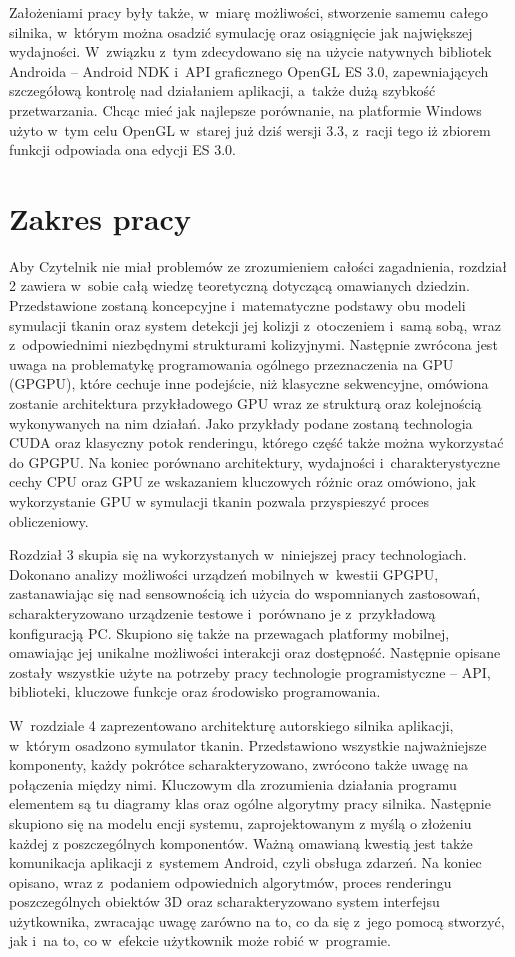 	Założeniami pracy były także, w~miarę możliwości, stworzenie samemu całego silnika, w~którym można osadzić symulację oraz osiągnięcie jak największej wydajności. W~związku z~tym zdecydowano się na użycie natywnych bibliotek Androida -- Android NDK i~API graficznego OpenGL ES 3.0, zapewniających szczegółową kontrolę nad działaniem aplikacji, a~także dużą szybkość przetwarzania. Chcąc mieć jak najlepsze porównanie, na platformie Windows użyto w~tym celu OpenGL w~starej już dziś wersji 3.3, z~racji tego iż zbiorem funkcji odpowiada ona edycji ES 3.0.
	
	\section{Zakres pracy}
	\label{t:wprowadzenie:zakres}
	
	Aby Czytelnik nie miał problemów ze zrozumieniem całości zagadnienia, rozdział 2 zawiera w~sobie całą wiedzę teoretyczną dotyczącą omawianych dziedzin. Przedstawione zostaną koncepcyjne i~matematyczne podstawy obu modeli symulacji tkanin oraz system detekcji jej kolizji z~otoczeniem i~samą sobą, wraz z~odpowiednimi niezbędnymi strukturami kolizyjnymi. Następnie zwrócona jest uwaga na problematykę programowania ogólnego przeznaczenia na GPU (GPGPU), które cechuje inne podejście, niż klasyczne sekwencyjne, omówiona zostanie architektura przykładowego GPU wraz ze strukturą oraz kolejnością wykonywanych na nim działań. Jako przykłady podane zostaną technologia CUDA oraz klasyczny potok renderingu, którego część także można wykorzystać do GPGPU. Na koniec porównano architektury, wydajności i~charakterystyczne cechy CPU oraz GPU ze wskazaniem kluczowych różnic oraz omówiono, jak wykorzystanie GPU w symulacji tkanin pozwala przyspieszyć proces obliczeniowy.
	
	Rozdział 3 skupia się na wykorzystanych w~niniejszej pracy technologiach. Dokonano analizy możliwości urządzeń mobilnych w~kwestii GPGPU, zastanawiając się nad sensownością ich użycia do wspomnianych zastosowań, scharakteryzowano urządzenie testowe i~porównano je z~przykładową konfiguracją PC. Skupiono się także na przewagach platformy mobilnej, omawiając jej unikalne możliwości interakcji oraz dostępność. Następnie opisane zostały wszystkie użyte na potrzeby pracy technologie programistyczne -- API, biblioteki, kluczowe funkcje oraz środowisko programowania.
	
	W~rozdziale 4 zaprezentowano architekturę autorskiego silnika aplikacji, w~którym osadzono symulator tkanin. Przedstawiono wszystkie najważniejsze komponenty, każdy pokrótce scharakteryzowano, zwrócono także uwagę na połączenia między nimi. Kluczowym dla zrozumienia działania programu elementem są tu diagramy klas oraz ogólne algorytmy pracy silnika. Następnie skupiono się na modelu encji systemu, zaprojektowanym z myślą o złożeniu każdej z poszczególnych komponentów. Ważną omawianą kwestią jest także komunikacja aplikacji z~systemem Android, czyli obsługa zdarzeń. Na koniec opisano, wraz z~podaniem odpowiednich algorytmów, proces renderingu poszczególnych obiektów 3D oraz scharakteryzowano system interfejsu użytkownika, zwracając uwagę zarówno na to, co da się z~jego pomocą stworzyć, jak i~na to, co w~efekcie użytkownik może robić w~programie.
	
